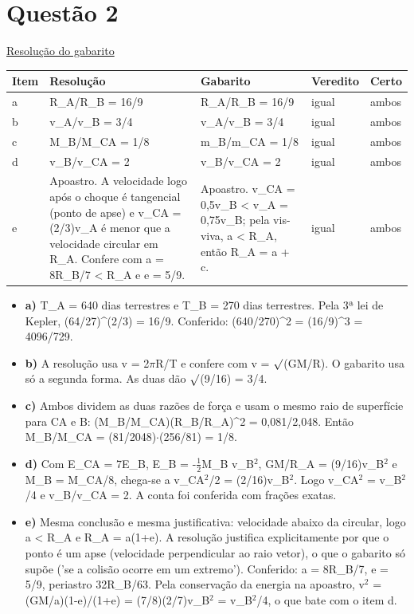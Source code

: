\documentclass{article}%
\begin{document}
\section*{Questão 2}%
\href{https://poliedroresolve.sistemapoliedro.com.br/vestibulares/ime/2026/ime-2-fase-dia-2-24-10-2025-2-fase-dia-2/dissertativa-2-fisica-2-fase-dia-2-ime-2026}{Resolução do gabarito}\par\smallskip%
\begin{longtable}{@{}p{} p{} p{} p{} p{}@{}}\toprule Item & Resolução & Gabarito & Veredito & Certo \\ \midrule
a & R\_A/R\_B = 16/9 & R\_A/R\_B = 16/9 & igual & ambos \\
b & v\_A/v\_B = 3/4 & v\_A/v\_B = 3/4 & igual & ambos \\
c & M\_B/M\_CA = 1/8 & m\_B/m\_CA = 1/8 & igual & ambos \\
d & v\_B/v\_CA = 2 & v\_B/v\_CA = 2 & igual & ambos \\
e & Apoastro. A velocidade logo após o choque é tangencial (ponto de apse) e v\_CA = (2/3)v\_A é menor que a velocidade circular em R\_A. Confere com a = 8R\_B/7 < R\_A e e = 5/9. & Apoastro. v\_CA = 0,5v\_B < v\_A = 0,75v\_B; pela vis{-}viva, a < R\_A, então R\_A = a + c. & igual & ambos \\
\bottomrule\end{longtable}%
\begin{itemize}%
\item%
\textbf{a)} T\_A = 640 dias terrestres e T\_B = 270 dias terrestres. Pela 3ª lei de Kepler, (64/27)\^{}(2/3) = 16/9. Conferido: (640/270)\^{}2 = (16/9)\^{}3 = 4096/729.%
\item%
\textbf{b)} A resolução usa v = 2$\pi$R/T e confere com v = $\surd$(GM/R). O gabarito usa só a segunda forma. As duas dão $\surd$(9/16) = 3/4.%
\item%
\textbf{c)} Ambos dividem as duas razões de força e usam o mesmo raio de superfície para CA e B: (M\_B/M\_CA)(R\_B/R\_A)\^{}2 = 0,081/2,048. Então M\_B/M\_CA = (81/2048)$\cdot$(256/81) = 1/8.%
\item%
\textbf{d)} Com E\_CA = 7E\_B, E\_B = -$\frac12$M\_B v\_B$^2$, GM/R\_A = (9/16)v\_B$^2$ e M\_B = M\_CA/8, chega{-}se a v\_CA$^2$/2 = (2/16)v\_B$^2$. Logo v\_CA$^2$ = v\_B$^2$/4 e v\_B/v\_CA = 2. A conta foi conferida com frações exatas.%
\item%
\textbf{e)} Mesma conclusão e mesma justificativa: velocidade abaixo da circular, logo a < R\_A e R\_A = a(1+e). A resolução justifica explicitamente por que o ponto é um apse (velocidade perpendicular ao raio vetor), o que o gabarito só supõe ('se a colisão ocorre em um extremo'). Conferido: a = 8R\_B/7, e = 5/9, periastro 32R\_B/63. Pela conservação da energia na apoastro, v$^2$ = (GM/a)(1-e)/(1+e) = (7/8)(2/7)v\_B$^2$ = v\_B$^2$/4, o que bate com o item d.%
\end{itemize}%
\end{document}
